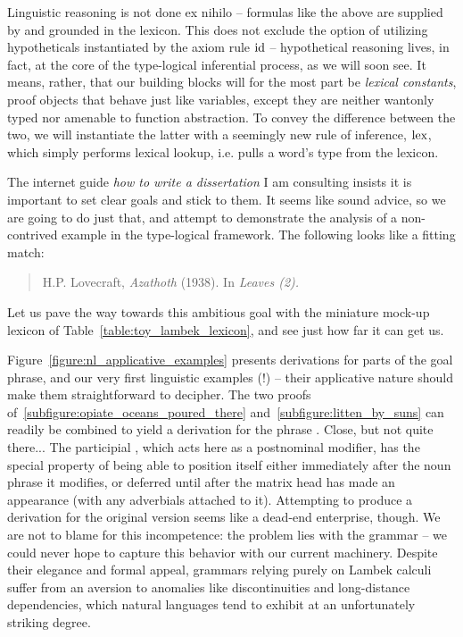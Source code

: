 Linguistic reasoning is not done ex nihilo -- formulas like the above are supplied by and grounded in the lexicon. 
This does not exclude the option of utilizing hypotheticals instantiated by the axiom rule $\mathrm{id}$ -- hypothetical reasoning lives, in fact, at the core of the type-logical inferential process, as we will soon see.
It means, rather, that our building blocks will for the most part be \textit{lexical constants}, proof objects that behave just like variables, except they are neither wantonly typed nor amenable to function abstraction.
To convey the difference between the two, we will instantiate the latter with a seemingly new rule of inference, $\mathrm{lex}$, which simply performs lexical lookup, i.e. pulls a word's type from the lexicon.

The internet guide \textit{how to write a dissertation} I am consulting insists it is important to set clear goals and stick to them.
It seems like sound advice, so we are going to do just that, and attempt to demonstrate the analysis of a non-contrived example in the type-logical framework.
The following looks like a fitting match:
\begin{quote}
\begin{flushright} H.P. Lovecraft, \textit{Azathoth}  (1938). In \textit{Leaves (2).}\end{flushright}
\end{quote}
Let us pave the way towards this ambitious goal with the miniature mock-up lexicon of Table~\ref{table:toy_lambek_lexicon}, and see just how far it can get us.

Figure~\ref{figure:nl_applicative_examples} presents derivations for parts of the goal phrase, and our very first linguistic examples (!) -- their applicative nature should make them straightforward to decipher.
The two proofs of~\ref{subfigure:opiate_oceans_poured_there} and~\ref{subfigure:litten_by_suns} can readily be combined to yield a derivation for the phrase . 
Close, but not quite there...
The participial , which acts here as a postnominal modifier, has the special property of being able to position itself either immediately after the noun phrase  it modifies, or deferred until after the matrix head  has made an appearance (with any adverbials attached to it).
Attempting to produce a derivation for the original version seems like a dead-end enterprise, though.
We are not to blame for this incompetence: the problem lies with the grammar -- we could never hope to capture this behavior with our current machinery.
Despite their elegance and formal appeal, grammars relying purely on Lambek calculi suffer from an aversion to anomalies like discontinuities and long-distance dependencies, which natural languages tend to exhibit at an unfortunately striking degree.

